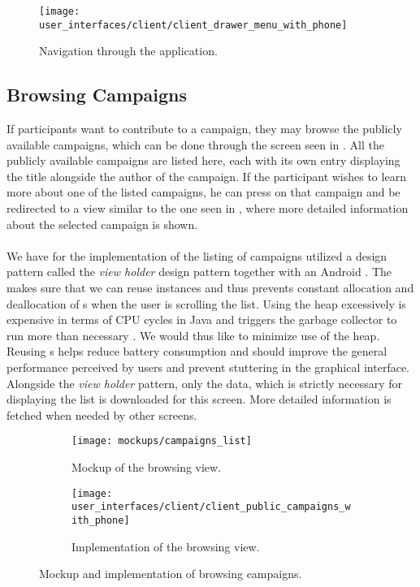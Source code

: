 \begin{figure}[!htbp]
    \centering
    \texttt{[image: user\_interfaces/client/client\_drawer\_menu\_with\_phone]}
    \caption{Navigation through the application.}
    \label{fig:navigation}
\end{figure}
\FloatBarrier

\subsection{Browsing Campaigns}
\label{sub:browsing_campaigns}



 If participants want to contribute to a campaign, they may browse the publicly available campaigns, which can be done through the screen seen in . All the publicly available campaigns are listed here, each with its own entry displaying the title alongside the author of the campaign. If the participant wishes to learn more about one of the listed campaigns, he can press on that campaign and be redirected to a view similar to the one seen in , where more detailed information about the selected campaign is shown. 
\\\\
We have for the implementation of the listing of campaigns utilized a design pattern called the \emph{view holder} design pattern \parencite{view_holder_pattern} together with an Android . The  makes sure that we can reuse  instances and thus prevents constant allocation and deallocation of s when the user is scrolling the list. Using the heap excessively is expensive in terms of CPU cycles in Java and triggers the garbage collector to run more than necessary \parencite{android_garbage_collection}. We would thus like to minimize use of the heap. Reusing s helps reduce battery consumption and should improve the general performance perceived by users and prevent stuttering in the graphical interface. Alongside the \emph{view holder} pattern, only the data, which is strictly necessary for displaying the list is downloaded for this screen. More detailed information is fetched when needed by other screens.

\begin{figure}[!htbp]
    \begin{subfigure}[!t]{.48\textwidth}
        \centering
        \texttt{[image: mockups/campaigns\_list]}
        \caption{Mockup of the browsing view.}
        \label{fig:mockup_public_campaigns}
    \end{subfigure}%
    \begin{subfigure}[!t]{.52\textwidth}
        \centering
        \texttt{[image: user\_interfaces/client/client\_public\_campaigns\_with\_phone]}
        \caption{Implementation of the browsing view.}
        \label{fig:implementation_public_campaigns}
    \end{subfigure}
    \caption{Mockup and implementation of browsing campaigns.}
    \label{fig:public_campaigns}
\end{figure}
\FloatBarrier


